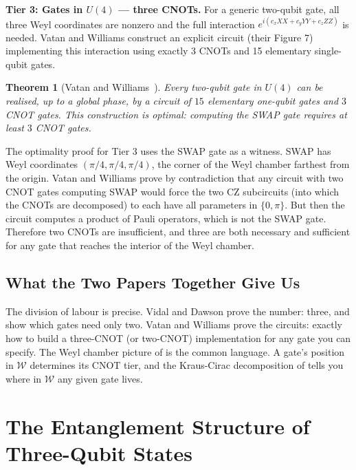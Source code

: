 \documentclass[12pt, a4paper, oneside]{report}
\theoremstyle{plain}
\newtheorem{theorem}{Theorem}[chapter]
\theoremstyle{definition}
\theoremstyle{remark}
\begin{document}
\textbf{Tier 3: Gates in $U(4)$ --- three CNOTs.}
For a generic two-qubit gate, all three Weyl coordinates are nonzero and the full
interaction $e^{i(c_x XX + c_y YY + c_z ZZ)}$ is needed. Vatan and Williams construct an
explicit circuit (their Figure 7) implementing this interaction using exactly 3 CNOTs and
15 elementary single-qubit gates.

\begin{theorem}[Vatan and Williams~\cite{vatan2004}]
\label{thm:vatan-williams}
Every two-qubit gate in $U(4)$ can be realised, up to a global phase, by a circuit of
$15$ elementary one-qubit gates and $3$ CNOT gates. This construction is optimal: computing
the SWAP gate requires at least $3$ CNOT gates.
\end{theorem}

The optimality proof for Tier 3 uses the SWAP gate as a witness. SWAP has Weyl coordinates
$({\pi}/{4}, {\pi}/{4}, {\pi}/{4})$, the corner of the Weyl chamber farthest from the
origin. Vatan and Williams prove by contradiction that any circuit with two CNOT gates
computing SWAP would force the two CZ subcircuits (into which the CNOTs are decomposed) to
each have all parameters in $\{0, \pi\}$. But then the circuit computes a product of Pauli
operators, which is not the SWAP gate. Therefore two CNOTs are insufficient, and three are
both necessary and sufficient for any gate that reaches the interior of the Weyl chamber.

\subsection{What the Two Papers Together Give Us}

The division of labour is precise. Vidal and Dawson prove the number: three, and show which
gates need only two. Vatan and Williams prove the circuits: exactly how to build a three-CNOT
(or two-CNOT) implementation for any gate you can specify. The Weyl chamber picture of
 is the common language. A gate's position in $\mathcal{W}$ determines its CNOT
tier, and the Kraus-Cirac decomposition of  tells you where in
$\mathcal{W}$ any given gate lives.


\section{The Entanglement Structure of Three-Qubit States}
\label{sec:three-qubit-ent}
\end{document}
